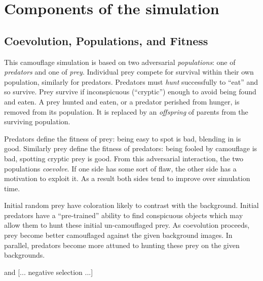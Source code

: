 \documentclass[sigconf]{acmart}
\newcommand{\jargon}[1]{\textit{#1}}
\begin{document}
\section{Components of the simulation}
\subsection{Coevolution, Populations, and Fitness}
This camouflage simulation is based on two adversarial \jargon{populations}: one of \jargon{predators} and one of \jargon{prey}. Individual prey compete for survival within their own population, similarly for predators. Predators must \jargon{hunt} successfully to “eat” and so survive. Prey survive if inconspicuous (“cryptic”) enough to avoid being found and eaten. A prey hunted and eaten, or a predator perished from hunger, is removed from its population. It is replaced by an \jargon{offspring} of parents from the surviving population.
\par
Predators define the fitness of prey: being easy to spot is bad, blending in is good. Similarly prey define the fitness of predators: being fooled by camouflage is bad, spotting cryptic prey is good. From this adversarial interaction, the two populations \jargon{coevolve}. If one side has some sort of flaw, the other side has a motivation to exploit it. As a result both sides tend to improve over simulation time.
\par
Initial random prey have coloration likely to contrast with the background. Initial predators have a “pre-trained” ability to find conspicuous objects which may allow them to hunt these initial un-camouflaged prey. As coevolution proceeds, prey become better camouflaged against the given background images. In parallel, predators become more attuned to hunting these prey on the given backgrounds.
\par
[... tournaments relative fitness in game-like competition ...] and [... negative selection ...]
\par
\end{document}
